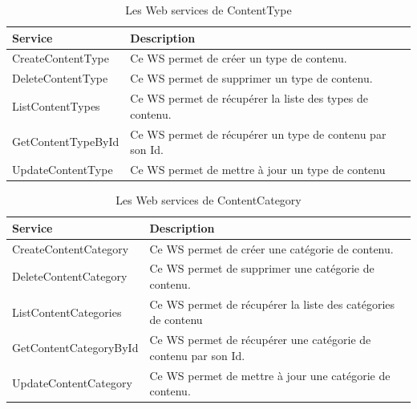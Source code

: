 \begin{table}[H]
    \centering
    \begin{tabular}{|m{5cm}|m{10cm}|}
    \hline
    \textbf{Service} & \textbf{Description} \\
    \hline
    CreateContentType & Ce WS permet de créer un type de contenu.\\
\hline
DeleteContentType & Ce WS permet de supprimer un type de contenu.\\
\hline
ListContentTypes & Ce WS permet de récupérer la liste des types de contenu.\\
\hline
GetContentTypeById & Ce WS permet de récupérer un type de contenu par son Id.\\
\hline

UpdateContentType & Ce WS permet de mettre à jour un type de contenu\\
\hline
    \end{tabular}
    \caption{Les Web services de ContentType}
    \label{tab:my_label}
\end{table}






\begin{table}[H]
    \centering
    \begin{tabular}{|m{5cm}|m{10cm}|}
    \hline
    \textbf{Service} & \textbf{Description} \\
    \hline
    CreateContentCategory & Ce WS permet de créer une catégorie de contenu. \\
    \hline
    DeleteContentCategory & Ce WS permet de supprimer une catégorie de contenu.\\
    \hline
    ListContentCategories & Ce WS permet de récupérer la liste des catégories de contenu\\
    \hline
    GetContentCategoryById & Ce WS permet de récupérer une catégorie de contenu par son Id.\\
    \hline
    UpdateContentCategory & Ce WS permet de mettre à jour une catégorie de contenu.\\
    \hline
    \end{tabular}
    \caption{Les Web services de ContentCategory}
    \label{tab:my_label}
\end{table}




